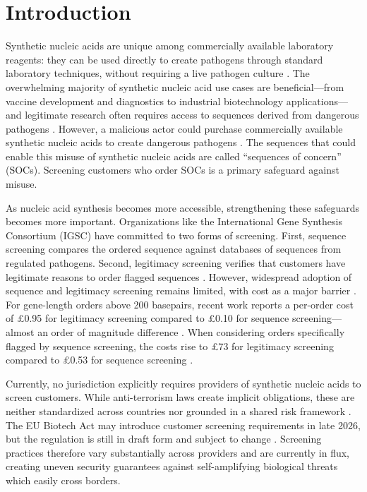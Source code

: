 \documentclass[utf8]{FrontiersinHarvard}
\begin{document}
\section{Introduction}

Synthetic nucleic acids are unique among commercially available laboratory reagents: they can be used directly to create pathogens through standard laboratory techniques, without requiring a live pathogen culture \citep{Cello2002}. The overwhelming majority of synthetic nucleic acid use cases are beneficial—from vaccine development and diagnostics to industrial biotechnology applications—and legitimate research often requires access to sequences derived from dangerous pathogens \citep{Tan2021}. However, a malicious actor could purchase commercially available synthetic nucleic acids to create dangerous pathogens \citep{Haddad2025}. The sequences that could enable this misuse of synthetic nucleic acids are called ``sequences of concern'' (SOCs). Screening customers who order SOCs is a primary safeguard against misuse.

As nucleic acid synthesis becomes more accessible, strengthening these safeguards becomes more important. Organizations like the International Gene Synthesis Consortium (IGSC) have committed to two forms of screening. First, sequence screening compares the ordered sequence against databases of sequences from regulated pathogens. Second, legitimacy screening verifies that customers have legitimate reasons to order flagged sequences \citep{IGSC2024}. However, widespread adoption of sequence and legitimacy screening remains limited, with cost as a major barrier \citep{Crawford2024}. For gene-length orders above 200 basepairs, recent work reports a per-order cost of £0.95 for legitimacy screening compared to £0.10 for sequence screening—almost an order of magnitude difference \citep{Fady2025annexes}. When considering orders specifically flagged by sequence screening, the costs rise to £73 for legitimacy screening compared to £0.53 for sequence screening \citep{Fady2025costmodel}.

Currently, no jurisdiction explicitly requires providers of synthetic nucleic acids to screen customers. While anti-terrorism laws create implicit obligations, these are neither standardized across countries nor grounded in a shared risk framework \citep{Wheeler2024}. The EU Biotech Act may introduce customer screening requirements in late 2026, but the regulation is still in draft form and subject to change \citep{EUBiotechAct2025}. Screening practices therefore vary substantially across providers and are currently in flux, creating uneven security guarantees against self-amplifying biological threats which easily cross borders.
\end{document}
